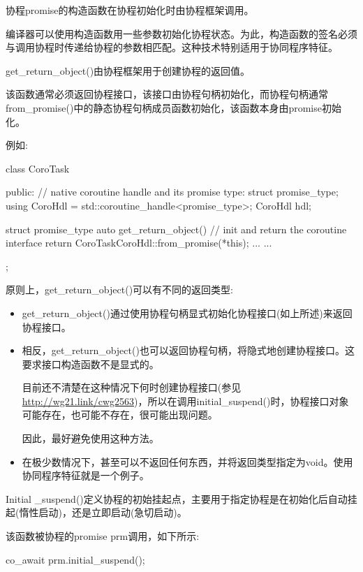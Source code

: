 
协程promise的构造函数在协程初始化时由协程框架调用。

编译器可以使用构造函数用一些参数初始化协程状态。为此，构造函数的签名必须与调用协程时传递给协程的参数相匹配。这种技术特别适用于协同程序特征。


get\_return\_object()由协程框架用于创建协程的返回值。

该函数通常必须返回协程接口，该接口由协程句柄初始化，而协程句柄通常from\_promise()中的静态协程句柄成员函数初始化，该函数本身由promise初始化。

例如:

\begin{cpp}
class CoroTask {
	public:
	// native coroutine handle and its promise type:
	struct promise_type;
	using CoroHdl = std::coroutine_handle<promise_type>;
	CoroHdl hdl;
	
	struct promise_type {
		auto get_return_object() { // init and return the coroutine interface
			return CoroTask{CoroHdl::from_promise(*this)};
		}
		...
	}
	...
};
\end{cpp}

原则上，get\_return\_object()可以有不同的返回类型:

\begin{itemize}
\item 
get\_return\_object()通过使用协程句柄显式初始化协程接口(如上所述)来返回协程接口。

\item
相反，get\_return\_object()也可以返回协程句柄，将隐式地创建协程接口。这要求接口构造函数不是显式的。

目前还不清楚在这种情况下何时创建协程接口(参见\url{http://wg21.link/cwg2563})，所以在调用initial\_suspend()时，协程接口对象可能存在，也可能不存在，很可能出现问题。

因此，最好避免使用这种方法。

\item
在极少数情况下，甚至可以不返回任何东西，并将返回类型指定为void。使用协同程序特征就是一个例子。
\end{itemize}


Initial \_suspend()定义协程的初始挂起点，主要用于指定协程是在初始化后自动挂起(惰性启动)，还是立即启动(急切启动)。

该函数被协程的promise prm调用，如下所示:

\begin{cpp}
co_await prm.initial_suspend();
\end{cpp}

